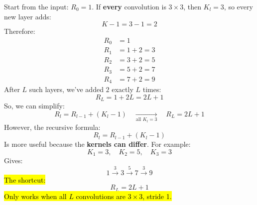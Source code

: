 \highspace
\begin{examplebox}
    Start from the input: $R_0=1$.
    If \textbf{every} convolution is $3\times3$, then $K_l=3$, so every new layer adds:
    \begin{equation*}
        K-1=3-1=2
    \end{equation*}
    Therefore:
    \begin{equation*}
        \begin{aligned}
            R_0 &= 1\\
            R_1 &= 1+2=3\\
            R_2 &= 3+2=5\\
            R_3 &= 5+2=7\\
            R_4 &= 7+2=9
        \end{aligned}
    \end{equation*}
    After $L$ such layers, we've added $2$ exactly $L$ times:
    \begin{equation*}
        R_L=1+2L=2L+1
    \end{equation*}
    So, we can simplify:
    \begin{equation}\label{eq:receptive-field-with-constant-kernel-3}
        R_l=R_{l-1}+(K_l-1)
        \quad\xrightarrow[\text{all }K_l=3]{}
        \quad
        R_L=2L+1
    \end{equation}
    However, the recursive formula:
    \begin{equation*}
        R_l=R_{l-1}+(K_l-1)
    \end{equation*}
    Is more useful because the \textbf{kernels can differ}. For example:
    \begin{equation*}
        K_1=3,\quad K_2=5,\quad K_3=3
    \end{equation*}
    Gives:
    \begin{equation*}
        1\xrightarrow{3}3\xrightarrow{5}7\xrightarrow{3}9
    \end{equation*}
    \hl{The shortcut:}
    \begin{equation*}
        R_L=2L+1
    \end{equation*}
    \hl{Only works when all $L$ convolutions are $3\times3$, stride 1.}
\end{examplebox}

\newpage

